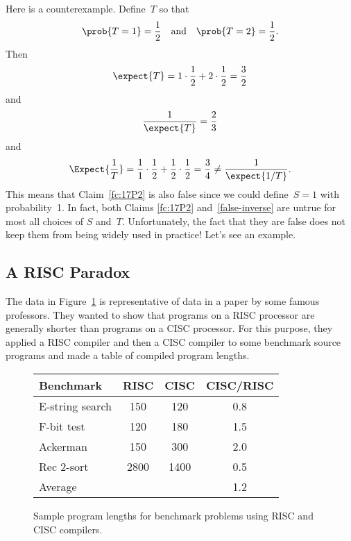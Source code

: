 Here is a counterexample.  Define~$T$ so that
\begin{equation*}
    \prob{T = 1} = \frac{1}{2} \quad\text{and}\quad
    \prob{T = 2} = \frac{1}{2}.
\end{equation*}
Then
\begin{equation*}
    \expect{T} = 1 \cdot \frac{1}{2} + 2 \cdot \frac{1}{2} =
    \frac{3}{2}
\end{equation*}
and
\begin{equation*}
    \frac{1}{\expect{T}} = \frac{2}{3}
\end{equation*}
and
\begin{equation*}
\Expect{\frac{1}{T}}
    = \frac{1}{1} \cdot \frac{1}{2} + \frac{1}{2} \cdot \frac{1}{2}
    = \frac{3}{4} 
    \ne \frac{1}{\expect{1/T}}.
\end{equation*}
This means that Claim~\ref{fc:17P2} is also false since we could
define~$S = 1$ with probability~1.  In fact, both Claims \ref{fc:17P2}
and~\ref{false-inverse} are untrue for most all choices of $S$
and~$T$.  Unfortunately, the fact that they are false does not keep
them from being widely used in practice!  Let's see an example.

\subsection{A RISC Paradox}

The data in Figure~\ref{fig:17P4} is representative of data in a paper
by some famous professors.  They wanted to show that programs on a
RISC processor are generally shorter than programs on a CISC
processor.  For this purpose, they applied a RISC compiler and then a
CISC compiler to some benchmark source programs and made a table of
compiled program lengths.

\begin{figure}

\begin{tabular}{lccc}
Benchmark        & RISC          & CISC          & CISC/RISC\\
\hline
E-string search  & 150           & 120           & 0.8 \\
F-bit test       & 120           & 180           & 1.5 \\
Ackerman         & 150           & 300           & 2.0 \\
Rec 2-sort       & 2800          & 1400          & 0.5 \\
\hline
Average          &               &               & 1.2
\end{tabular}

\caption{Sample program lengths for benchmark problems using RISC and
  CISC compilers.}

\label{fig:17P4}

\end{figure}

